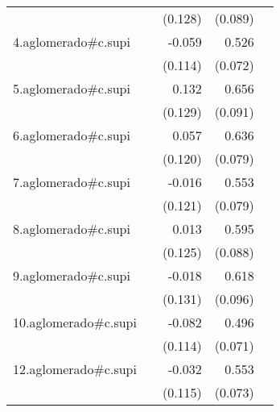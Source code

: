 {\begin{longtable}{l*{4}{D{.}{.}{-1}}}
            &                     &     (0.128)         &     (0.089)         &                     \\
\addlinespace
4.aglomerado#c.supi&                     &      -0.059         &       0.526\sym{***}&                     \\
            &                     &     (0.114)         &     (0.072)         &                     \\
\addlinespace
5.aglomerado#c.supi&                     &       0.132         &       0.656\sym{***}&                     \\
            &                     &     (0.129)         &     (0.091)         &                     \\
\addlinespace
6.aglomerado#c.supi&                     &       0.057         &       0.636\sym{***}&                     \\
            &                     &     (0.120)         &     (0.079)         &                     \\
\addlinespace
7.aglomerado#c.supi&                     &      -0.016         &       0.553\sym{***}&                     \\
            &                     &     (0.121)         &     (0.079)         &                     \\
\addlinespace
8.aglomerado#c.supi&                     &       0.013         &       0.595\sym{***}&                     \\
            &                     &     (0.125)         &     (0.088)         &                     \\
\addlinespace
9.aglomerado#c.supi&                     &      -0.018         &       0.618\sym{***}&                     \\
            &                     &     (0.131)         &     (0.096)         &                     \\
\addlinespace
10.aglomerado#c.supi&                     &      -0.082         &       0.496\sym{***}&                     \\
            &                     &     (0.114)         &     (0.071)         &                     \\
\addlinespace
12.aglomerado#c.supi&                     &      -0.032         &       0.553\sym{***}&                     \\
            &                     &     (0.115)         &     (0.073)         &                     \\

\end{longtable}}
